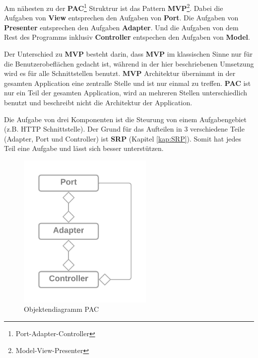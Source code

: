 Am nähesten zu der \textbf{PAC}\footnote{Port-Adapter-Controller} Struktrur 
ist das Pattern \textbf{MVP}\footnote{Model-View-Presenter}.
Dabei die Aufgaben von \textbf{View} entsprechen den Aufgaben von \textbf{Port}. 
Die Aufgaben von \textbf{Presenter} entsprechen den Aufgaben \textbf{Adapter}.
Und die Aufgaben von dem Rest des Programms inklusiv \textbf{Controller} entspechen den Aufgaben von \textbf{Model}.

Der Unterschied zu \textbf{MVP} besteht darin, dass \textbf{MVP} im klassischen Sinne nur für die Benutzerobeflächen gedacht ist,
während in der hier beschriebenen Umsetzung wird es für alle Schnittstellen benutzt.
\textbf{MVP} Architektur übernimmt in der gesamten Application eine zentralle Stelle und ist nur einmal zu treffen.
\textbf{PAC} ist nur ein Teil der gesamten Application, wird an mehreren Stellen unterschiedlich benutzt und beschreibt nicht 
die Architektur der Application.

Die Aufgabe von drei Komponenten ist die Steurung von einem Aufgabengebiet (z.B. HTTP Schnittstelle).
Der Grund für das Aufteilen in 3 verschiedene Teile (Adapter, Port und Controller) ist
\textbf{SRP} (Kapitel \ref{kap:SRP}). Somit hat jedes Teil eine Aufgabe und lässt sich besser 
unterstützen. 


\begin{figure}[H]
   \centering
   \includegraphics[width=6.5cm]{./images/Port-Adapter-Contoller.png}
    \caption[Objektendiagramm PAC]{Objektendiagramm PAC \footnotemark}
    \label{fig:CDPAC}
\end{figure}
